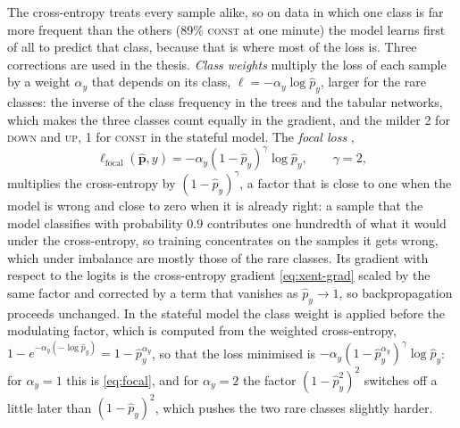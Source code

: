 The cross-entropy treats every sample alike, so on data in which one class is far more
frequent than the others (89\% \textsc{const} at one minute) the model learns first of all
to predict that class, because that is where most of the loss is.  Three corrections are
used in the thesis.  \emph{Class weights} multiply the loss of each sample by a weight
$\alpha_{y}$ that depends on its class, $\ell = -\alpha_{y} \log \hat{p}_{y}$, larger for
the rare classes: the inverse of the class frequency in the trees and the tabular
networks, which makes the three classes count equally in the gradient, and the milder
2 for \textsc{down} and \textsc{up}, 1 for \textsc{const} in the stateful model.  The \emph{focal loss}
\cite{lin2017focal},
\begin{equation}
  \ell_{\mathrm{focal}}(\hat{\mathbf{p}}, y) = -\alpha_{y} (1 - \hat{p}_{y})^{\gamma} \log \hat{p}_{y},
  \qquad \gamma = 2,
  \label{eq:focal}
\end{equation}
multiplies the cross-entropy by $(1 - \hat{p}_y)^{\gamma}$, a factor that is close to one
when the model is wrong and close to zero when it is already right: a sample that the model
classifies with probability $0.9$ contributes one hundredth of what it would under the
cross-entropy, so training concentrates on the samples it gets wrong, which under
imbalance are mostly those of the rare classes.  Its gradient with respect to the logits is
the cross-entropy gradient \cref{eq:xent-grad} scaled by the same factor and corrected by
a term that vanishes as $\hat{p}_y \to 1$, so backpropagation proceeds unchanged.  In the
stateful model the class weight is applied before the modulating factor, which is computed
from the weighted cross-entropy, $1 - e^{-\alpha_y (-\log \hat{p}_y)} = 1 -
\hat{p}_y^{\alpha_y}$, so that the loss minimised is
$-\alpha_{y} (1 - \hat{p}_{y}^{\alpha_{y}})^{\gamma} \log \hat{p}_{y}$: for
$\alpha_y = 1$ this is \cref{eq:focal}, and for $\alpha_y = 2$ the factor
$(1 - \hat{p}_y^{2})^{2}$ switches off a little later than $(1 - \hat{p}_y)^{2}$, which
pushes the two rare classes slightly harder.

